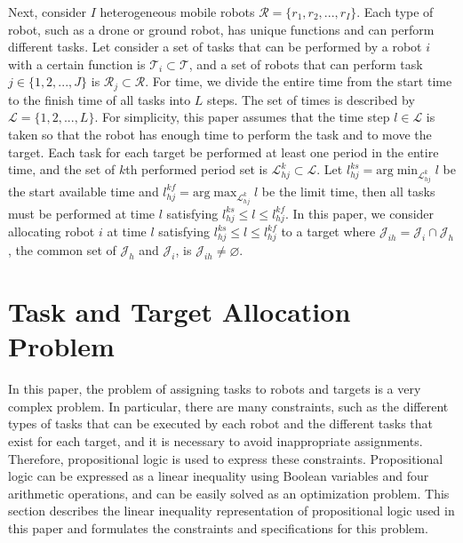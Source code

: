 \documentclass[]{interact}
\theoremstyle{plain}%
\theoremstyle{definition}
\theoremstyle{remark}
\begin{document}
Next, consider $I$ heterogeneous mobile robots $\mathcal{R}=\{r_1,r_2,...,r_I\}$.
Each type of robot, such as a drone or ground robot, has unique functions and can perform different tasks.
Let consider a set of tasks that can be performed by a robot $i$ with a certain function is $\mathcal{T}_i\subset\mathcal{T}$, and a set of robots that can perform task $j\in\{1,2,...,J\}$ is $\mathcal{R}_j\subset\mathcal{R}$. 
For time, we divide the entire time from the start time to the finish time of all tasks into $L$ steps. 
The set of times is described by $\mathcal{L}=\{1,2,...,L\}$.
For simplicity, this paper assumes that the time step $l\in\mathcal{L}$ is taken so that the robot has enough time to perform the task and to move the target.
Each task for each target be performed at least one period in the entire time, and the set of $k$th performed period set is $\mathcal{L}^k_{hj}\subset\mathcal{L}$. 
Let $l^{ks}_{hj} = \mathrm{arg}\min_{\mathcal{L}^k_{hj}} l$ be the start available time and $l^{kf}_{hj} = \mathrm{arg}\max_{\mathcal{L}^k_{hj}} l$ be the limit time, then all tasks must be performed at time $l$ satisfying $l^{ks}_{hj} \le l \le l^{kf}_{hj}$.
In this paper, we consider allocating robot $i$ at time $l$ satisfying $l^{ks}_{hj} \le l \le l^{kf}_{hj}$ to a target where $\mathcal{J}_{ih}=\mathcal{J}_{i}\cap\mathcal{J}_{h}$, the common set of $\mathcal{J}_h$ and $\mathcal{J}_i$, is $\mathcal{J}_{ih}\neq \varnothing$.

\section{Task and Target Allocation Problem}
In this paper, the problem of assigning tasks to robots and targets is a very complex problem. 
In particular, there are many constraints, such as the different types of tasks that can be executed by each robot and the different tasks that exist for each target, and it is necessary to avoid inappropriate assignments.
Therefore, propositional logic is used to express these constraints. 
Propositional logic can be expressed as a linear inequality using Boolean variables and four arithmetic operations, and can be easily solved as an optimization problem. 
This section describes the linear inequality representation of propositional logic used in this paper and formulates the constraints and specifications for this problem.
\end{document}
